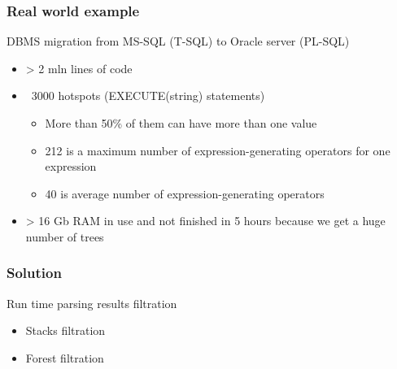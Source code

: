 \documentclass{beamer}
\begin{document}
\begin{frame}
	\transwipe[direction=90]
	\frametitle{Real world example}
    DBMS migration from MS-SQL (T-SQL) to Oracle server (PL-SQL)
    \begin{itemize}
       \item > 2 mln lines of code
       \item ~3000 hotspots (EXECUTE(string) statements)
       \begin{itemize}
           \item More than 50\% of them can have more than one value
           \item 212 is a maximum number of expression-generating operators for one expression
           \item 40 is average number of expression-generating operators
       \end{itemize}
       \pause
       \item > 16 Gb RAM in use and not finished in 5 hours because we get a huge number of trees
    \end{itemize}
\end{frame}

\begin{frame}
	\transwipe[direction=90]
	\frametitle{Solution}
  Run time parsing results filtration
  \begin{itemize}
   \item Stacks filtration
   \item Forest filtration
  \end{itemize}
\end{frame}
\end{document}
